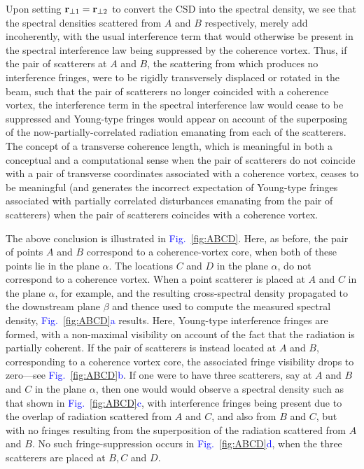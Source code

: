 \documentclass[%
 reprint,
 amsmath,amssymb,
 aps,
]{revtex4-1}
\begin{document}
Upon setting ${\bf r}_{\perp 1}={\bf r}_{\perp 2}$ to convert the CSD into the spectral density, we see that the spectral densities scattered from $A$ and $B$ respectively, merely add incoherently, with the usual interference term that would otherwise be present in the spectral interference law \cite{mandel_wolf} being suppressed by the coherence vortex.  Thus, if the pair of scatterers at $A$ and $B$, the scattering from which produces no interference fringes, were to be rigidly transversely displaced or rotated in the beam, such that the pair of scatterers no longer coincided with a coherence vortex, the interference term in the spectral interference law would cease to be suppressed and Young-type fringes would appear on account of the superposing of the now-partially-correlated radiation emanating from each of the scatterers.  The concept of a transverse coherence length, which is meaningful in both a conceptual and a computational sense when the pair of scatterers do not coincide with a pair of transverse coordinates associated with a coherence vortex, ceases to be meaningful (and generates the incorrect expectation of Young-type fringes associated with partially correlated disturbances emanating from the pair of scatterers) when the pair of scatterers coincides with a coherence vortex.     

The above conclusion is illustrated in \textcolor{blue}{Fig.~\ref{fig:ABCD}}.  Here, as before, the pair of points $A$ and $B$ correspond to a coherence-vortex core, when both of these points lie in the plane $\alpha$. The locations $C$ and $D$ in the plane $\alpha$, do not correspond to a coherence vortex.  When a point scatterer is placed at $A$ and $C$ in the plane $\alpha$, for example, and the resulting cross-spectral density propagated to the downstream plane $\beta$ and thence used to compute the measured spectral density, \textcolor{blue}{Fig.~\ref{fig:ABCD}a} results.  Here, Young-type interference fringes are formed, with a non-maximal visibility on account of the fact that the radiation is partially coherent.  If the pair of scatterers is instead located at $A$ and $B$, corresponding to a coherence vortex core, the associated fringe visibility drops to zero---see \textcolor{blue}{Fig.~\ref{fig:ABCD}b}.  If one were to have three scatterers, say at $A$ and $B$ and $C$ in the plane $\alpha$, then one would would observe a spectral density such as that shown in \textcolor{blue}{Fig.~\ref{fig:ABCD}c}, with interference fringes being present due to the overlap of radiation scattered from $A$ and $C$, and also from $B$ and $C$, but with no fringes resulting from the superposition of the radiation scattered from $A$ and $B$. No such fringe-suppression occurs in \textcolor{blue}{Fig.~\ref{fig:ABCD}d}, when the three scatterers are placed at $B,C$ and $D$. 
\end{document}
